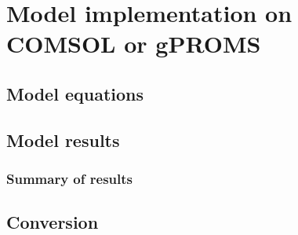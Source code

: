 \section{Model implementation on COMSOL or gPROMS}
\subsection{Model equations}
\subsection{Model results}
\subsubsection{Summary of results}
\subsection{Conversion}